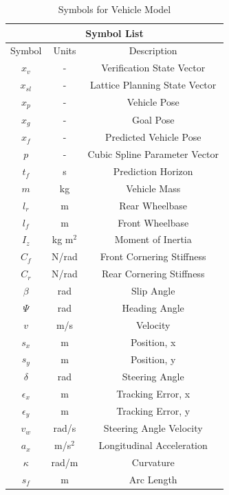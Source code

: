 \begin{table}
	\centering
	\caption{Symbols for Vehicle Model}
	\begin{tabular}{|c|c|c|}
		\hline
		\multicolumn{3}{|c|}{Symbol List} \\ \hline
		 Symbol & Units & Description \\ \hline
		$x_v$ & - & Verification State Vector \\ \hline 
		$x_{sl}$ & - & Lattice Planning State Vector \\ \hline
		$x_p$ & - & Vehicle Pose \\ \hline
		$x_g$ & - & Goal Pose \\ \hline
		$x_f$ & - & Predicted Vehicle Pose \\ \hline
		$p$ & - & Cubic Spline Parameter Vector \\ \hline
		$t_f$ & s & Prediction Horizon \\ \hline
		$m$ & kg & Vehicle Mass \\ \hline
		$l_r$ & m & Rear Wheelbase \\ \hline
		$l_f$ & m & Front Wheelbase \\ \hline
		$I_z$ & kg m$^2$ & Moment of Inertia \\ \hline
		$C_f$ & N/rad & Front Cornering Stiffness  \\ \hline
		$C_r$ & N/rad & Rear Cornering Stiffness \\ \hline
		$\beta$ & rad & Slip Angle \\ \hline
		$\Psi$ & rad & Heading Angle \\ \hline
		$v$ & m/s & Velocity \\ \hline
		$s_x$ & m & Position, x \\ \hline
		$s_y$ & m & Position, y \\ \hline
		$\delta$ & rad & Steering Angle \\ \hline
		$\epsilon_x$ & m & Tracking Error, x \\ \hline
		$\epsilon_y$ & m & Tracking Error, y \\ \hline
		$v_w$ & rad/s & Steering Angle Velocity \\ \hline 
		$a_x$ & m/s$^2$ & Longitudinal Acceleration \\ \hline
		$\kappa$ & rad/m & Curvature \\ \hline
		$s_f$ & m & Arc Length \\ \hline	
	\end{tabular}	
	\label{table:vehiclemodel}
\end{table}

